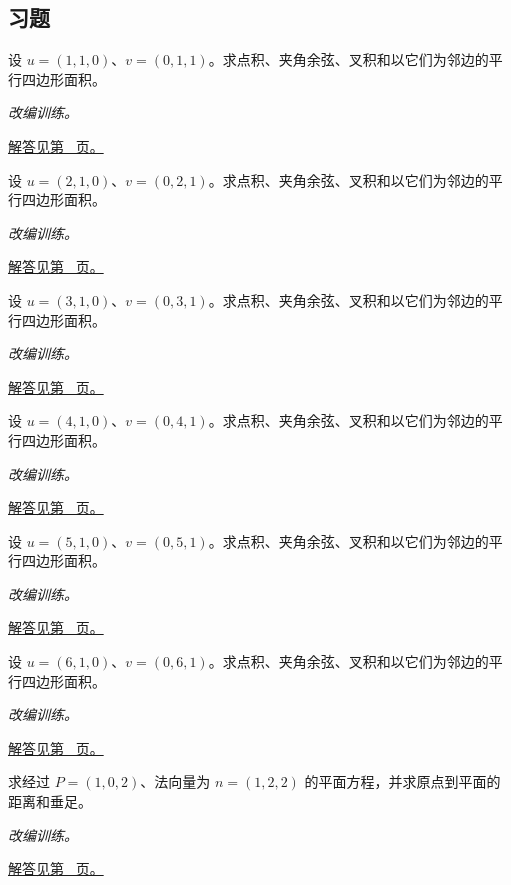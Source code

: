 \documentclass[12pt,fontset=fandol]{ctexart}
\begin{document}
\subsection{习题}
\begin{example}[点积、叉积与平行四边形]\label{ex:c31q1}
设 $u=(1,1,0)$、$v=(0,1,1)$。求点积、夹角余弦、叉积和以它们为邻边的平行四边形面积。
\par\textit{改编训练。}\par\hyperref[ans:c31q1]{解答见第~\pageref{ans:c31q1} 页。}
\end{example}
\begin{example}[点积、叉积与平行四边形]\label{ex:c31q2}
设 $u=(2,1,0)$、$v=(0,2,1)$。求点积、夹角余弦、叉积和以它们为邻边的平行四边形面积。
\par\textit{改编训练。}\par\hyperref[ans:c31q2]{解答见第~\pageref{ans:c31q2} 页。}
\end{example}
\begin{example}[点积、叉积与平行四边形]\label{ex:c31q3}
设 $u=(3,1,0)$、$v=(0,3,1)$。求点积、夹角余弦、叉积和以它们为邻边的平行四边形面积。
\par\textit{改编训练。}\par\hyperref[ans:c31q3]{解答见第~\pageref{ans:c31q3} 页。}
\end{example}
\begin{example}[点积、叉积与平行四边形]\label{ex:c31q4}
设 $u=(4,1,0)$、$v=(0,4,1)$。求点积、夹角余弦、叉积和以它们为邻边的平行四边形面积。
\par\textit{改编训练。}\par\hyperref[ans:c31q4]{解答见第~\pageref{ans:c31q4} 页。}
\end{example}
\begin{example}[点积、叉积与平行四边形]\label{ex:c31q5}
设 $u=(5,1,0)$、$v=(0,5,1)$。求点积、夹角余弦、叉积和以它们为邻边的平行四边形面积。
\par\textit{改编训练。}\par\hyperref[ans:c31q5]{解答见第~\pageref{ans:c31q5} 页。}
\end{example}
\begin{example}[点积、叉积与平行四边形]\label{ex:c31q6}
设 $u=(6,1,0)$、$v=(0,6,1)$。求点积、夹角余弦、叉积和以它们为邻边的平行四边形面积。
\par\textit{改编训练。}\par\hyperref[ans:c31q6]{解答见第~\pageref{ans:c31q6} 页。}
\end{example}
\begin{example}[平面方程与点面距离]\label{ex:c31q7}
求经过 $P=(1,0,2)$、法向量为 $n=(1,2,2)$ 的平面方程，并求原点到平面的距离和垂足。
\par\textit{改编训练。}\par\hyperref[ans:c31q7]{解答见第~\pageref{ans:c31q7} 页。}
\end{example}
\end{document}
